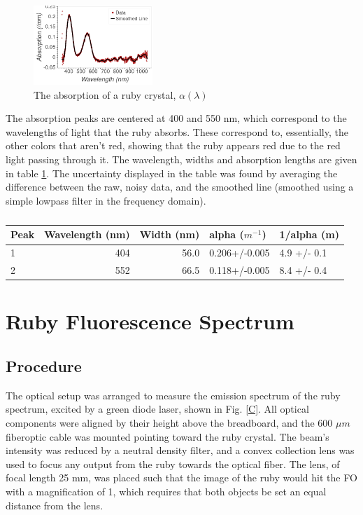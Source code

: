 \documentclass[aps,prl,reprint]{revtex4-2}
\begin{document}
\begin{figure}[h]
	\includegraphics[width=0.4\textwidth]{../Images/l3_B_c.png}
	\caption{\label{absorption} The absorption of a ruby crystal, $\alpha(\lambda)$}
\end{figure}

The absorption peaks are centered at 400 and 550 nm, which correspond to the wavelengths
of light that the ruby absorbs. These correspond to, essentially, the other colors 
that aren't red, showing that the ruby appears red due to the red light passing through
it. The wavelength, widths and absorption lengths are given in table \ref{abs}. The
uncertainty displayed in the table was found by averaging the difference between the
raw, noisy data, and the smoothed line (smoothed using a simple lowpass filter in the
frequency domain).

\begin{table}[h]
\begin{tabular}{lrrll}
\toprule
Peak &  Wavelength (nm) &  Width (nm) &          alpha ($m^{-1}$) &        1/alpha (m) \\
\hline
1 &              404 &        56.0 &  0.206+/-0.005 &  4.9 +/- 0.1   \\
2 &              552 &        66.5 &  0.118+/-0.005 &  8.4 +/- 0.4   \\
\hline
\hline
\end{tabular}
\caption{\label{abs}}
\end{table}

\section{Ruby Fluorescence Spectrum}

\subsection{Procedure}
The optical setup was arranged to measure the emission spectrum of the ruby spectrum, 
excited by a green diode laser, shown in Fig. \ref{C}. All optical components were 
aligned by their height above the breadboard, and the 600 $\mu m$ fiberoptic cable
was mounted pointing toward the ruby crystal. The beam's intensity was reduced by
a neutral density filter, and a convex collection lens was used to focus any
output from the ruby towards the optical fiber. The lens, of focal length 25 mm, was
placed such that the image of the ruby would hit the FO with a magnification of 1,
which requires that both objects be set an equal distance from the lens. \\
\end{document}
